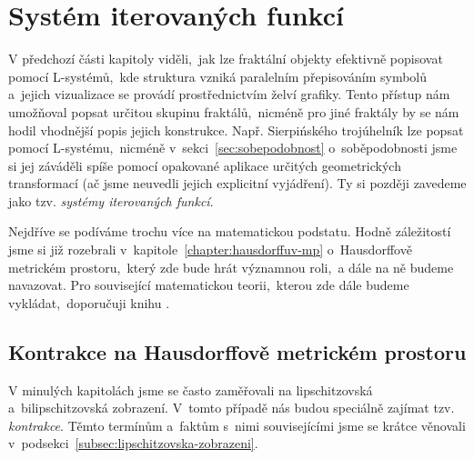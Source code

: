 \section{Systém iterovaných funkcí}\label{sec:ifs}

V předchozí části kapitoly viděli,~jak lze fraktální objekty efektivně popisovat pomocí L-systémů,~kde struktura vzniká paralelním přepisováním symbolů a~jejich vizualizace se provádí prostřednictvím želví grafiky. Tento přístup nám umožňoval popsat určitou skupinu fraktálů,~nicméně pro jiné fraktály by se nám hodil vhodnější popis jejich konstrukce. Např. Sierpińského trojúhelník lze popsat pomocí L-systému,~nicméně v~sekci~\ref{sec:sobepodobnost} o~soběpodobnosti jsme si jej záváděli spíše pomocí opakované aplikace určitých geometrických transformací (ač jsme neuvedli jejich explicitní vyjádření). Ty si později zavedeme jako tzv. \emph{systémy iterovaných funkcí}.

Nejdříve se podíváme trochu více na matematickou podstatu. Hodně záležitostí jsme si již rozebrali v~kapitole~\ref{chapter:hausdorffuv-mp} o~Hausdorffově metrickém prostoru,~který zde bude hrát významnou roli,~a dále na ně budeme navazovat. Pro související matematickou teorii,~kterou zde dále budeme vykládat,~doporučuji knihu \cite{Barnsley1993}.

\subsection{Kontrakce na Hausdorffově metrickém prostoru}\label{subsec:hausdorffuv-mp-kontrakce}

V minulých kapitolách jsme se často zaměřovali na lipschitzovská a~bilipschitzovská zobrazení. V~tomto případě nás budou speciálně zajímat tzv. \emph{kontrakce}. Těmto termínům a~faktům s~nimi souvisejícími jsme se krátce věnovali v~podsekci~\ref{subsec:lipschitzovska-zobrazeni}.

